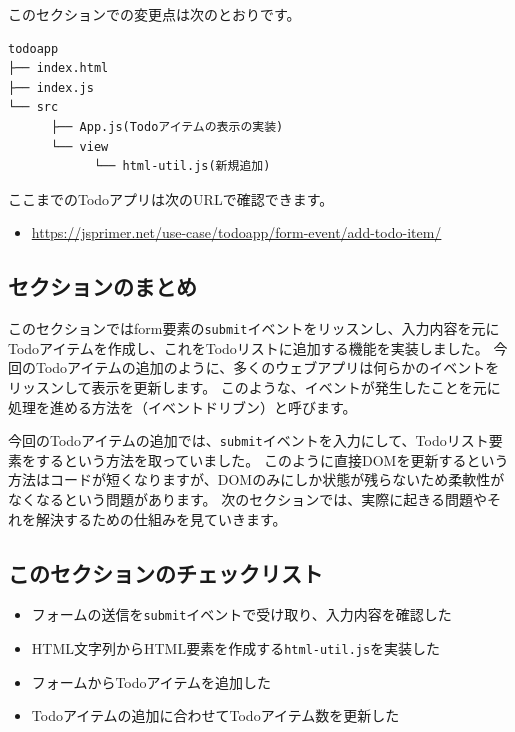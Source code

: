 \newpage
このセクションでの変更点は次のとおりです。

\begin{lstlisting}
todoapp
├── index.html
├── index.js
└── src
      ├── App.js(Todoアイテムの表示の実装)
      └── view
            └── html-util.js(新規追加)
\end{lstlisting}

ここまでのTodoアプリは次のURLで確認できます。

\begin{itemize}
\item
  \url{https://jsprimer.net/use-case/todoapp/form-event/add-todo-item/}
\end{itemize}

\hypertarget{conclusion}{%
\subsection{セクションのまとめ}\label{conclusion}}

このセクションではform要素の\texttt{submit}イベントをリッスンし、入力内容を元にTodoアイテムを作成し、これをTodoリストに追加する機能を実装しました。
今回のTodoアイテムの追加のように、多くのウェブアプリは何らかのイベントをリッスンして表示を更新します。
このような、イベントが発生したことを元に処理を進める方法を\textbf{}（イベントドリブン）と呼びます。

今回のTodoアイテムの追加では、\texttt{submit}イベントを入力にして、Todoリスト要素を\textbf{}するという方法を取っていました。
このように直接DOMを更新するという方法はコードが短くなりますが、DOMのみにしか状態が残らないため柔軟性がなくなるという問題があります。
次のセクションでは、実際に起きる問題やそれを解決するための仕組みを見ていきます。

\hypertarget{section-checklist}{%
\subsection{このセクションのチェックリスト}\label{section-checklist}}

\begin{itemize}
\item
  フォームの送信を\texttt{submit}イベントで受け取り、入力内容を確認した
\item
  HTML文字列からHTML要素を作成する\texttt{html-util.js}を実装した
\item
  フォームからTodoアイテムを追加した
\item
  Todoアイテムの追加に合わせてTodoアイテム数を更新した
\end{itemize}

